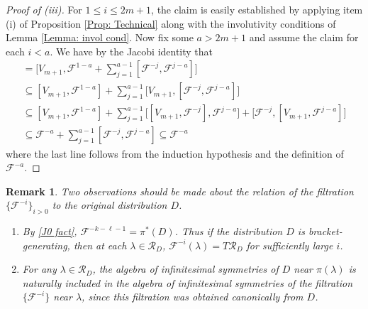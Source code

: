 \documentclass[11pt,letterpaper]{amsart}
\newtheorem{remark}[theorem]{Remark}
\numberwithin{equation}{section}
\begin{document}
\begin{proof}[Proof of (iii)]
    For $1\leq i \leq 2m+1$, the claim is easily established by applying item (i) of Proposition \ref{Prop: Technical} along with the involutivity conditions of Lemma \ref{Lemma: invol cond}. Now fix some $a>2m+1$ and assume the claim for each $i<a$. We have by the Jacobi identity that
    \begin{gather}
        [V_{m+1},\mathcal{F}^{-a}] =  \Big[V_{m+1},\mathcal{F}^{1-a}+\sum_{j=1}^{a-1}[\mathcal{F}^{-j},\mathcal{F}^{j-a}]\Big]
        \\
         \subseteq [V_{m+1},\mathcal{F}^{1-a}] + \sum_{j=1}^{a-1}\big[V_{m+1},[\mathcal{F}^{-j},\mathcal{F}^{j-a}]\big]
        \\
         \subseteq [V_{m+1},\mathcal{F}^{1-a}]+ \sum_{j=1}^{a-1}\big[[V_{m+1},\mathcal{F}^{-j}],\mathcal{F}^{j-a}\big] + \big[\mathcal{F}^{-j},[V_{m+1},\mathcal{F}^{j-a}]\big]
        \\
        \subseteq \mathcal{F}^{-a} + \sum_{j=1}^{a-1}[\mathcal{F}^{-j},\mathcal{F}^{j-a}] \subseteq \mathcal{F}^{-a}
    \end{gather}
    where the last line follows from the induction hypothesis and the definition of $\mathcal{F}^{-a}$.
\end{proof}

\begin{remark}
    \label{Remark: D and F}
    Two observations should be made about the relation of the filtration $\{\mathcal{F}^{-i}\}_{i>0}$ to the original distribution $D$.
    \begin{enumerate}
        \item By \eqref{J0 fact}, $\mathcal{F}^{-k-\ell-1}=\pi^*(D)$. Thus if the distribution $D$ is bracket-generating, then at each $\lambda\in \mathcal{R}_D$, $\mathcal{F}^{-i}(\lambda)=T\mathcal R_D$ for sufficiently large $i$.
        \item For any $\lambda\in \mathcal R_D$, the algebra of infinitesimal symmetries of $D$ near $\pi(\lambda)$ is naturally included in the algebra of infinitesimal symmetries of the filtration $\{\mathcal{F}^{-i}\}$ near $\lambda$, since this filtration was obtained canonically from $D$.
    \end{enumerate}
\end{remark}
\end{document}
